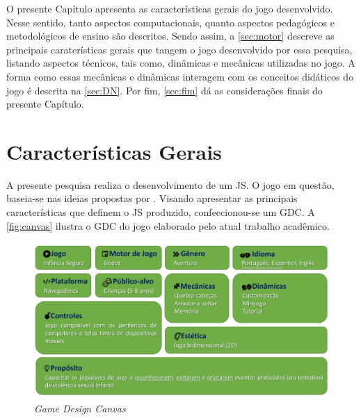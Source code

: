 O presente Capítulo apresenta as características gerais do jogo desenvolvido. Nesse sentido, tanto aspectos computacionais, quanto aspectos pedagógicos e metodológicos de ensino são descritos. Sendo assim, a \autoref{sec:motor} descreve as principais caraterísticas gerais que tangem o jogo desenvolvido por essa pesquisa, listando aspectos técnicos, tais como, dinâmicas e mecânicas utilizadas no jogo. A forma como essas mecânicas e dinâmicas interagem com os conceitos didáticos do jogo é descrita na \autoref{sec:DN}. Por fim, \autoref{sec:fim} dá as considerações finais do presente Capítulo. 


\section{Características Gerais}\label{sec:motor}

A presente pesquisa realiza o desenvolvimento de um \acf{JS}. O jogo em questão, baseia-se nas ideias propostas por . Visando apresentar as principais características que definem o \ac{JS} produzido, confeccionou-se um \ac{GDC}. A \autoref{fig:canvas} ilustra o \acl{GDC} do jogo elaborado pelo atual trabalho acadêmico. 

\begin{figure}[hbt!]
  \caption{\label{fig:canvas}\textit{Game Design Canvas}}\vspace{-0.2cm}
  \begin{center}
    \includegraphics[width=\linewidth]{./Visuais/canvas2.pdf}
    \end{center}\vspace{-0.4cm}
\end{figure}

